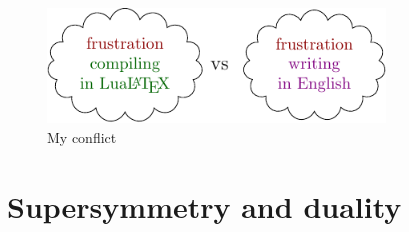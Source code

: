 \documentclass[a4paper,pdftex,10pt]{article}
\begin{document}
\begin{figure}[ht]
  \centering
  \includegraphics[width=0.8\textwidth]{fig/picture01.pdf}
  \caption{My conflict}
  \label{fig:myconflict}
\end{figure}


\clearpage
\section{Supersymmetry and duality}





















\clearpage



\end{document}
